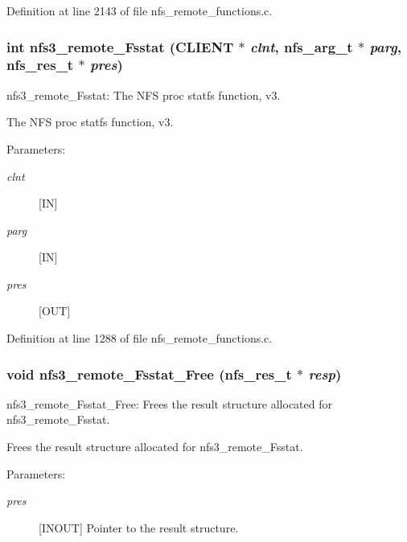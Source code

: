 Definition at line 2143 of file nfs\_\-remote\_\-functions.c.
\subsubsection[{nfs3\_\-remote\_\-Fsstat}]{\setlength{\rightskip}{0pt plus 5cm}int nfs3\_\-remote\_\-Fsstat (CLIENT $\ast$ {\em clnt}, \/  nfs\_\-arg\_\-t $\ast$ {\em parg}, \/  nfs\_\-res\_\-t $\ast$ {\em pres})}\label{group__NFSprocs_gcaf68e26bbfe72e9b23a06911afe6e0d}


nfs3\_\-remote\_\-Fsstat: The NFS proc statfs function, v3.

The NFS proc statfs function, v3.

\begin{Desc}
\item[Parameters:]
\begin{description}
\item[{\em clnt}][IN] \item[{\em parg}][IN] \item[{\em pres}][OUT] \end{description}
\end{Desc}


Definition at line 1288 of file nfs\_\-remote\_\-functions.c.
\subsubsection[{nfs3\_\-remote\_\-Fsstat\_\-Free}]{\setlength{\rightskip}{0pt plus 5cm}void nfs3\_\-remote\_\-Fsstat\_\-Free (nfs\_\-res\_\-t $\ast$ {\em resp})}\label{group__NFSprocs_g166810381d038e556307172be9fdf2f7}


nfs3\_\-remote\_\-Fsstat\_\-Free: Frees the result structure allocated for nfs3\_\-remote\_\-Fsstat.

Frees the result structure allocated for nfs3\_\-remote\_\-Fsstat.

\begin{Desc}
\item[Parameters:]
\begin{description}
\item[{\em pres}][INOUT] Pointer to the result structure. \end{description}
\end{Desc}



